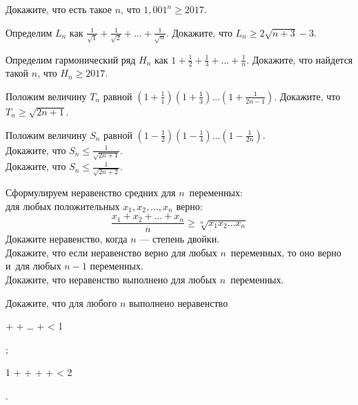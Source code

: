 



\begin{problems}

\item
Докажите, что есть такое $n$, что $1{,}001^{n} \geq 2017$.

\item
Определим $L_{n}$ как 
\(
    \frac{1}{\sqrt{1}} + \frac{1}{\sqrt{2}} + \ldots + \frac{1}{\sqrt{n}}
\).
Докажите, что $L_{n} \geq 2 \sqrt{n + 3} - 3$. 

\item
Определим гармонический ряд $H_{n}$ как 
\(
    1 + \frac{1}{2} + \frac{1}{3} + \ldots + \frac{1}{n}
\).
Докажите, что найдется такой $n$, что $H_{n} \geq 2017$.

\item
Положим величину $T_{n}$ равной
\(
    \left( 1 + \frac{1}{1} \right)
    \left( 1 + \frac{1}{3} \right)
    \ldots
    \left( 1 + \frac{1}{2n - 1} \right)
\).
Докажите, что $T_{n} \geq \sqrt{2 n + 1}$.

\item
Положим величину $S_{n}$ равной
\(
    \left( 1 - \frac{1}{2} \right)
    \left( 1 - \frac{1}{4} \right)
    \ldots
    \left( 1 - \frac{1}{2n} \right)
\).
\\
\subproblem
Докажите, что $S_{n} \leq \frac{1}{\sqrt{2 n + 1}}$.
\\
\subproblem
Докажите, что $S_{n} \leq \frac{1}{\sqrt{2 n + 2}}$.

\item
Сформулируем неравенство средних для $n$~переменных:\\
для любых положительных $x_1, x_2, \ldots, x_n$ верно:
\[
    \frac{x_{1} + x_{2} + \ldots + x_{n}}{n}
\geq
    \sqrt[n]{x_{1} x_{2} \ldots x_{n}}
\]
\subproblem
Докажите неравенство, когда $n$ --- степень двойки.
\\
\subproblem
Докажите, что если неравенство верно для любых $n$~переменных, то оно верно
и~для любых $n - 1$ переменных.
\\
\subproblem
Докажите, что неравенство выполнено для любых $n$~переменных.

\item
Докажите, что для любого $n$ выполнено неравенство
\begin{subproblemeq}
     +  + \ldots
    + 
<
    1
\end{subproblemeq};
\begin{subproblemeq}
    1 +  +  + \cdots + 
<
    2
\end{subproblemeq}.

\end{problems}

